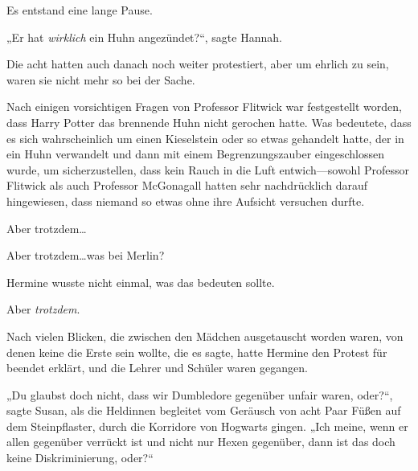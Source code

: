 Es entstand eine lange Pause.

„Er hat \emph{wirklich} ein Huhn angezündet?“, sagte Hannah.

\later

Die acht hatten auch danach noch weiter protestiert, aber um ehrlich zu sein, waren sie nicht mehr so bei der Sache.

Nach einigen vorsichtigen Fragen von Professor Flitwick war festgestellt worden, dass Harry Potter das brennende Huhn nicht gerochen hatte. Was bedeutete, dass es sich wahrscheinlich um einen Kieselstein oder so etwas gehandelt hatte, der in ein Huhn verwandelt und dann mit einem Begrenzungszauber eingeschlossen wurde, um sicherzustellen, dass kein Rauch in die Luft entwich—sowohl Professor Flitwick als auch Professor McGonagall hatten sehr nachdrücklich darauf hingewiesen, dass niemand so etwas ohne ihre Aufsicht versuchen durfte.

Aber trotzdem…

Aber trotzdem…was bei Merlin?

Hermine wusste nicht einmal, was das bedeuten sollte.

Aber \emph{trotzdem}.

Nach vielen Blicken, die zwischen den Mädchen ausgetauscht worden waren, von denen keine die Erste sein wollte, die es sagte, hatte Hermine den Protest für beendet erklärt, und die Lehrer und Schüler waren gegangen.

„Du glaubst doch nicht, dass wir Dumbledore gegenüber unfair waren, oder?“, sagte Susan, als die Heldinnen begleitet vom Geräusch von acht Paar Füßen auf dem Steinpflaster, durch die Korridore von Hogwarts gingen. „Ich meine, wenn er allen gegenüber verrückt ist und nicht nur Hexen gegenüber, dann ist das doch keine Diskriminierung, oder?“

